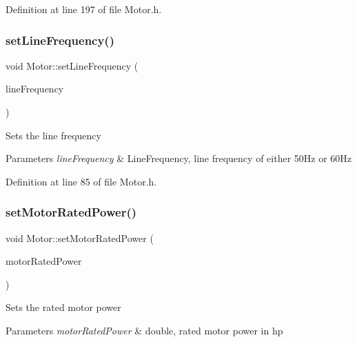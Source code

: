 Definition at line 197 of file Motor.\+h.

\mbox{\label{class_motor_a450e5ecea25b05413b731379f153c3f1}} 
\subsubsection{\texorpdfstring{set\+Line\+Frequency()}{setLineFrequency()}}
{\footnotesize\ttfamily void Motor\+::set\+Line\+Frequency (\begin{DoxyParamCaption}\item[{\hyperlink{class_motor_acee1bdf1b684ad36cb80dc2829d9fcee}{Line\+Frequency}}]{line\+Frequency }\end{DoxyParamCaption})\hspace{0.3cm}{\ttfamily [inline]}}

Sets the line frequency


\begin{DoxyParams}{Parameters}
{\em line\+Frequency} & Line\+Frequency, line frequency of either 50\+Hz or 60\+Hz \\
\hline
\end{DoxyParams}


Definition at line 85 of file Motor.\+h.

\mbox{\label{class_motor_aa01f82db13c71b045b05e49f42ba46e9}} 
\subsubsection{\texorpdfstring{set\+Motor\+Rated\+Power()}{setMotorRatedPower()}}
{\footnotesize\ttfamily void Motor\+::set\+Motor\+Rated\+Power (\begin{DoxyParamCaption}\item[{double}]{motor\+Rated\+Power }\end{DoxyParamCaption})\hspace{0.3cm}{\ttfamily [inline]}}

Sets the rated motor power


\begin{DoxyParams}{Parameters}
{\em motor\+Rated\+Power} & double, rated motor power in hp \\
\hline
\end{DoxyParams}


